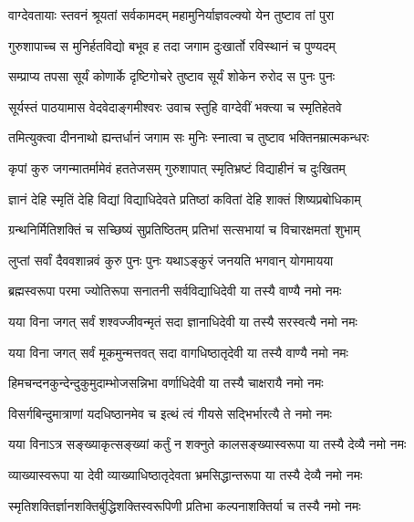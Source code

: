 

\twolineshloka
{वाग्देवतायाः स्तवनं श्रूयतां सर्वकामदम्}
{महामुनिर्याज्ञवल्क्यो येन तुष्टाव तां पुरा}%

\twolineshloka
{गुरुशापाच्च स मुनिर्हतविद्यो बभूव ह}
{तदा जगाम दुःखार्तो रविस्थानं च पुण्यदम्}%

\twolineshloka
{सम्प्राप्य तपसा सूर्यं कोणार्के दृष्टिगोचरे}
{तुष्टाव सूर्यं शोकेन रुरोद स पुनः पुनः}%

\twolineshloka
{सूर्यस्तं पाठयामास वेदवेदाङ्गमीश्वरः}
{उवाच स्तुहि वाग्देवीं भक्त्या च स्मृतिहेतवे}%

\twolineshloka
{तमित्युक्त्वा दीननाथो ह्यन्तर्धानं जगाम सः}
{मुनिः स्नात्वा च तुष्टाव भक्तिनम्रात्मकन्धरः}%

\twolineshloka
{कृपां कुरु जगन्मातर्मामेवं हततेजसम्}
{गुरुशापात् स्मृतिभ्रष्टं विद्याहीनं च दुःखितम्}%

\twolineshloka
{ज्ञानं देहि स्मृतिं देहि विद्यां विद्याधिदेवते}
{प्रतिष्ठां कवितां देहि शाक्तं शिष्यप्रबोधिकाम्}%

\twolineshloka
{ग्रन्थनिर्मितिशक्तिं च सच्छिष्यं सुप्रतिष्ठितम्}
{प्रतिभां सत्सभायां च विचारक्षमतां शुभाम्}%

\twolineshloka
{लुप्तां सर्वां दैववशान्नवं कुरु पुनः पुनः}
{यथाऽङ्कुरं जनयति भगवान् योगमायया}%

\twolineshloka
{ब्रह्मस्वरूपा परमा ज्योतिरूपा सनातनी}
{सर्वविद्याधिदेवी या तस्यै वाण्यै नमो नमः}%

\twolineshloka
{यया विना जगत् सर्वं शश्वज्जीवन्मृतं सदा}
{ज्ञानाधिदेवी या तस्यै सरस्वत्यै नमो नमः}%

\twolineshloka
{यया विना जगत् सर्वं मूकमुन्मत्तवत् सदा}
{वागधिष्ठातृदेवी या तस्यै वाण्यै नमो नमः}%

\twolineshloka
{हिमचन्दनकुन्देन्दुकुमुदाम्भोजसन्निभा}
{वर्णाधिदेवी या तस्यै चाक्षरायै नमो नमः}%

\twolineshloka
{विसर्गबिन्दुमात्राणां यदधिष्ठानमेव च}
{इत्थं त्वं गीयसे सद्भिर्भारत्यै ते नमो नमः}%

\twolineshloka
{यया विनाऽत्र सङ्ख्याकृत्सङ्ख्यां कर्तुं न शक्नुते}
{कालसङ्ख्यास्वरूपा या तस्यै देव्यै नमो नमः}%

\twolineshloka
{व्याख्यास्वरूपा या देवी व्याख्याधिष्ठातृदेवता}
{भ्रमसिद्धान्तरूपा या तस्यै देव्यै नमो नमः}%

\twolineshloka
{स्मृतिशक्तिर्ज्ञानशक्तिर्बुद्धिशक्तिस्वरूपिणी}
{प्रतिभा कल्पनाशक्तिर्या च तस्यै नमो नमः}%

